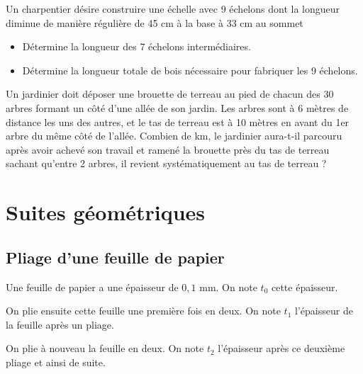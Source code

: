 \documentclass[a4paper,12pt]{report}
\begin{document}
\begin{exercice}
Un charpentier désire construire une échelle avec 9 échelons dont la longueur
diminue de manière régulière de 45 cm à la base à 33 cm au sommet

\begin{itemize}
\item Détermine la longueur des 7 échelons intermédiaires.
\item Détermine la longueur totale de bois nécessaire pour fabriquer les 9 échelons.
\end{itemize}
\end{exercice}

\begin{exercice}
Un jardinier doit déposer une brouette de terreau au pied de chacun des 30 arbres
formant un côté d'une allée de son jardin. Les arbres sont à 6 mètres de distance les
uns des autres, et le tas de terreau est à 10 mètres en avant du 1er arbre du même
côté de l'allée.
Combien de km, le jardinier aura-t-il parcouru après avoir achevé son travail et ramené
la brouette près du tas de terreau sachant qu’entre 2 arbres, il revient
systématiquement au tas de terreau ?
\end{exercice}

\chapter{Suites géométriques}
\label{sec:orge17a8ab}
\section{Pliage d'une feuille de papier}
\label{sec:org5a3b62c}

Une feuille de papier a une épaisseur de \(0,1\) mm. On note \(t_{0}\) cette épaisseur.

On plie ensuite cette feuille une première fois en deux. On note \(t_{1}\) l'épaisseur de la feuille après un pliage.

On plie à nouveau la feuille en deux. On note \(t_{2}\) l'épaisseur
après ce deuxième pliage et ainsi de suite.
\end{document}
